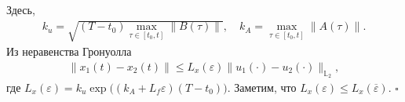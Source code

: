 \documentclass[../main.tex]{subfiles}
\begin{document}
Здесь, 
\begin{gather*}
	k_u = \sqrt{(T-t_0) \max\limits_{\tau \in [{t_0},t]}\|B(\tau)\|}, \quad k_A =\max\limits_{\tau \in [{t_0},t]} \| A(\tau)\|.
\end{gather*}
Из неравенства Гронуолла 
\begin{gather*}
	\| x_1(t) - x_2(t) \| \leqslant L_x(\varepsilon) \| u_1(\cdot) - u_2(\cdot) \|_{\mathbb{L}_2},
\end{gather*}
где $L_x(\varepsilon) = k_u \exp\big((k_A + L_f \varepsilon)(T - t_0)\big) $. Заметим, что $L_x(\varepsilon) \leqslant L_x(\overline{\varepsilon})$. 
\hfill$\square$\\[1ex]%



\end{document}
